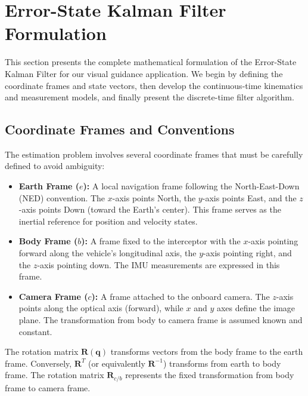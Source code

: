 \documentclass[11pt,a4paper]{article}
\newcommand{\quat}{\mathbf{q}}
\newcommand{\R}{\mathbf{R}}
\begin{document}
\section{Error-State Kalman Filter Formulation}
\label{sec:eskf}

This section presents the complete mathematical formulation of the Error-State Kalman Filter for our visual guidance application. We begin by defining the coordinate frames and state vectors, then develop the continuous-time kinematics and measurement models, and finally present the discrete-time filter algorithm.

\subsection{Coordinate Frames and Conventions}

The estimation problem involves several coordinate frames that must be carefully defined to avoid ambiguity:

\begin{itemize}
    \item \textbf{Earth Frame ($e$):} A local navigation frame following the North-East-Down (NED) convention. The $x$-axis points North, the $y$-axis points East, and the $z$-axis points Down (toward the Earth's center). This frame serves as the inertial reference for position and velocity states.
    
    \item \textbf{Body Frame ($b$):} A frame fixed to the interceptor with the $x$-axis pointing forward along the vehicle's longitudinal axis, the $y$-axis pointing right, and the $z$-axis pointing down. The IMU measurements are expressed in this frame.
    
    \item \textbf{Camera Frame ($c$):} A frame attached to the onboard camera. The $z$-axis points along the optical axis (forward), while $x$ and $y$ axes define the image plane. The transformation from body to camera frame is assumed known and constant.
\end{itemize}

The rotation matrix $\R(\quat)$ transforms vectors from the body frame to the earth frame. Conversely, $\R^T$ (or equivalently $\R^{-1}$) transforms from earth to body frame. The rotation matrix $\R_{c/b}$ represents the fixed transformation from body frame to camera frame.
\end{document}
